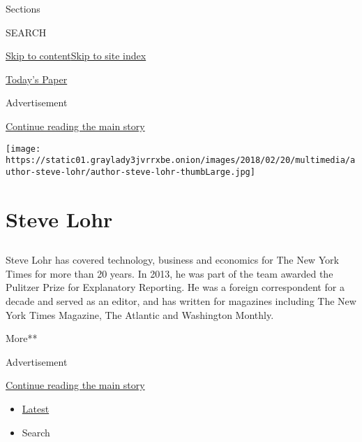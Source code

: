Sections

SEARCH

\protect\hyperlink{site-content}{Skip to
content}\protect\hyperlink{site-index}{Skip to site index}

\href{https://myaccount.nytimes3xbfgragh.onion/auth/login?response_type=cookie\&client_id=vi}{}

\href{https://www.nytimes3xbfgragh.onion/section/todayspaper}{Today's
Paper}

Advertisement

\protect\hyperlink{after-top}{Continue reading the main story}

\texttt{[image: https://static01.graylady3jvrrxbe.onion/images/2018/02/20/multimedia/author-steve-lohr/author-steve-lohr-thumbLarge.jpg]}

\hypertarget{steve-lohr}{%
\section{Steve Lohr}\label{steve-lohr}}

\subsection{}

Steve Lohr has covered technology, business and economics for The New
York Times for more than 20 years. In 2013, he was part of the team
awarded the Pulitzer Prize for Explanatory Reporting. He was a foreign
correspondent for a decade and served as an editor, and has written for
magazines including The New York Times Magazine, The Atlantic and
Washington Monthly.

More**

Advertisement

\protect\hyperlink{after-mid1}{Continue reading the main story}

\begin{itemize}
\tightlist
\item
  \protect\hyperlink{stream-panel}{Latest}
\item
  Search
\end{itemize}


